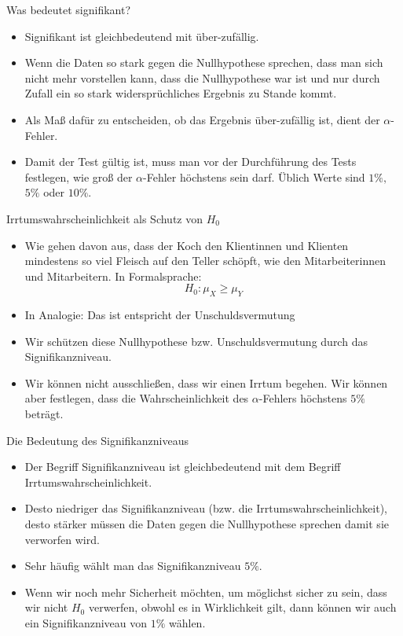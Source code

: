 \documentclass[usenames,dvipsnames,handout]{beamer}
\begin{document}
\begin{frame}{Was bedeutet signifikant?}
\begin{itemize}
\item{Signifikant ist gleichbedeutend mit über-zufällig.}
\item{Wenn die Daten so stark gegen die Nullhypothese sprechen, dass man sich nicht mehr vorstellen kann,
dass die Nullhypothese war ist und nur durch Zufall ein so stark widersprüchliches Ergebnis zu Stande kommt.}\pause
\item{Als Maß dafür zu entscheiden, ob das Ergebnis über-zufällig ist, dient der $\alpha$-Fehler.}\pause
\item{Damit der Test gültig ist, muss man vor der Durchführung des Tests festlegen, wie groß
der $\alpha$-Fehler höchstens sein darf. Üblich Werte sind $1\%,$ $5\%$ oder $10\%.$}
\end{itemize}
\end{frame}

\begin{frame}{Irrtumswahrscheinlichkeit als Schutz von $H_{0}$}

\begin{itemize}
\item{Wie gehen davon aus, dass der Koch den Klientinnen und Klienten mindestens so viel Fleisch auf den Teller
schöpft, wie den Mitarbeiterinnen und Mitarbeitern. In Formalsprache: $$H_{0}: \mu_{X} \geq \mu_{Y}$$ }\pause
\item{In Analogie: Das ist entspricht der Unschuldsvermutung}\pause
\item{Wir schützen diese Nullhypothese bzw. Unschuldsvermutung durch das Signifikanzniveau.}\pause
\item{Wir können nicht ausschließen, dass wir einen Irrtum begehen. Wir können aber festlegen,
dass die Wahrscheinlichkeit des $\alpha$-Fehlers höchstens $5\%$ beträgt.}\pause
\end{itemize}
\end{frame}

\begin{frame}{Die Bedeutung des Signifikanzniveaus}
\begin{itemize}
\item{Der Begriff Signifikanzniveau ist gleichbedeutend mit dem Begriff Irrtumswahrscheinlichkeit.}\pause
\item{Desto niedriger das Signifikanzniveau (bzw. die Irrtumswahrscheinlichkeit), desto stärker müssen 
die Daten gegen die Nullhypothese sprechen damit sie verworfen wird.}\pause
\item{Sehr häufig wählt man das Signifikanzniveau $5\%.$}\pause
\item{Wenn wir noch mehr Sicherheit möchten, um möglichst sicher zu sein, dass wir nicht 
$H_{0}$ verwerfen, obwohl es in Wirklichkeit gilt, dann können wir auch ein Signifikanzniveau von $1\%$ wählen.}
\end{itemize}
\end{frame}
\end{document}
